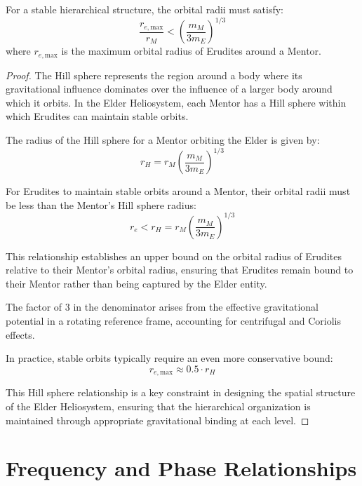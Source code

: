 \begin{theorem}
For a stable hierarchical structure, the orbital radii must satisfy:
\begin{equation}
\frac{r_{e,\text{max}}}{r_M} < \left(\frac{m_M}{3m_E}\right)^{1/3}
\end{equation}
where $r_{e,\text{max}}$ is the maximum orbital radius of Erudites around a Mentor.
\end{theorem}

\begin{proof}
The Hill sphere represents the region around a body where its gravitational influence dominates over the influence of a larger body around which it orbits. In the Elder Heliosystem, each Mentor has a Hill sphere within which Erudites can maintain stable orbits.

The radius of the Hill sphere for a Mentor orbiting the Elder is given by:
\begin{equation}
r_H = r_M \left(\frac{m_M}{3m_E}\right)^{1/3}
\end{equation}

For Erudites to maintain stable orbits around a Mentor, their orbital radii must be less than the Mentor's Hill sphere radius:
\begin{equation}
r_e < r_H = r_M \left(\frac{m_M}{3m_E}\right)^{1/3}
\end{equation}

This relationship establishes an upper bound on the orbital radius of Erudites relative to their Mentor's orbital radius, ensuring that Erudites remain bound to their Mentor rather than being captured by the Elder entity.

The factor of 3 in the denominator arises from the effective gravitational potential in a rotating reference frame, accounting for centrifugal and Coriolis effects.

In practice, stable orbits typically require an even more conservative bound:
\begin{equation}
r_{e,\text{max}} \approx 0.5 \cdot r_H
\end{equation}

This Hill sphere relationship is a key constraint in designing the spatial structure of the Elder Heliosystem, ensuring that the hierarchical organization is maintained through appropriate gravitational binding at each level.
\end{proof}

\section{Frequency and Phase Relationships}

